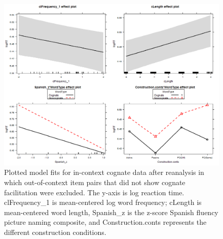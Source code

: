 \begin{figure}[htbp]
\centering
\includegraphics[width=\textwidth,height=\textheight,keepaspectratio]{Rplot38.png}
\caption{Plotted model fits for in-context cognate data after reanalysis in which out-of-context item pairs that did not show cognate facilitation were excluded. The y-axis is log reaction time. clFrequency\_1 is mean-centered log word frequency; cLength is mean-centered word length, Spanish\_z is the z-score Spanish fluency picture naming composite, and Construction.conts represents the different construction conditions. }
\label{fig:Rplot38}
\end{figure}


